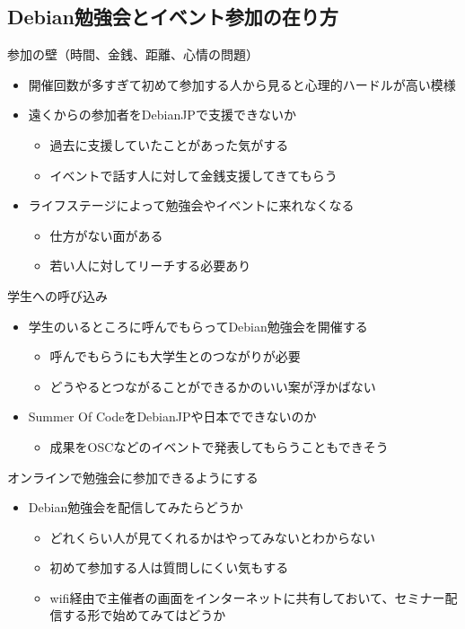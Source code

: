 \documentclass[mingoth,a4paper]{jsarticle}
\begin{document}
\subsection{Debian勉強会とイベント参加の在り方}
参加の壁（時間、金銭、距離、心情の問題）
\begin{itemize}
\item 開催回数が多すぎて初めて参加する人から見ると心理的ハードルが高い模様
\item 遠くからの参加者をDebianJPで支援できないか
  \begin{itemize}
    \item 過去に支援していたことがあった気がする
    \item イベントで話す人に対して金銭支援してきてもらう
  \end{itemize}
\item ライフステージによって勉強会やイベントに来れなくなる
  \begin{itemize}
    \item 仕方がない面がある
    \item 若い人に対してリーチする必要あり
  \end{itemize}
\end{itemize}
学生への呼び込み
\begin{itemize}
\item 学生のいるところに呼んでもらってDebian勉強会を開催する
  \begin{itemize}
  \item 呼んでもらうにも大学生とのつながりが必要
  \item どうやるとつながることができるかのいい案が浮かばない
  \end{itemize}
\item Summer Of CodeをDebianJPや日本でできないのか
  \begin{itemize}
  \item 成果をOSCなどのイベントで発表してもらうこともできそう
  \end{itemize}
\end{itemize}
オンラインで勉強会に参加できるようにする
\begin{itemize}
\item Debian勉強会を配信してみたらどうか
  \begin{itemize}
  \item どれくらい人が見てくれるかはやってみないとわからない
  \item 初めて参加する人は質問しにくい気もする
  \item wifi経由で主催者の画面をインターネットに共有しておいて、セミナー配信する形で始めてみてはどうか
  \end{itemize}
\end{itemize}
\end{document}
